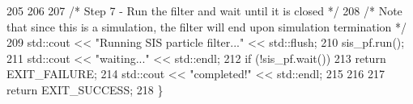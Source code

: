 \begin{DoxyCodeInclude}
205 
206 
207     \textcolor{comment}{/* Step 7 - Run the filter and wait until it is closed */}
208     \textcolor{comment}{/* Note that since this is a simulation, the filter will end upon simulation termination */}
209     std::cout << \textcolor{stringliteral}{"Running SIS particle filter..."} << std::flush;
210     sis\_pf.run();
211     std::cout << \textcolor{stringliteral}{"waiting..."} << std::endl;
212     \textcolor{keywordflow}{if} (!sis\_pf.wait())
213         \textcolor{keywordflow}{return} EXIT\_FAILURE;
214     std::cout << \textcolor{stringliteral}{"completed!"} << std::endl;
215 
216 
217     \textcolor{keywordflow}{return} EXIT\_SUCCESS;
218 \}
\end{DoxyCodeInclude}
 